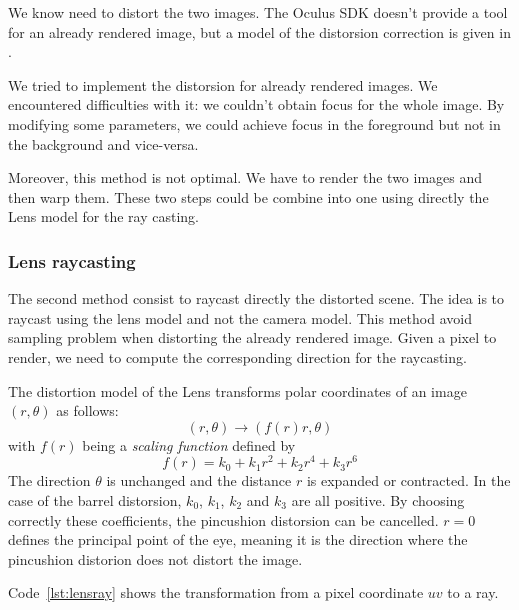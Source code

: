 \documentclass[12pt]{article}
\begin{document}
We know need to distort the two images. The Oculus SDK doesn't provide a tool for an already rendered image, but a model of the distorsion correction is given in \cite{OVRSDK}.

We tried to implement the distorsion for already rendered images. We encountered difficulties with it: we couldn't obtain focus for the whole image. By modifying some parameters, we could achieve focus in the foreground but not in the background and vice-versa.

Moreover, this method is not optimal. We have to render the two images and then warp them. These two steps could be combine into one using directly the Lens model for the ray casting.

\subsubsection{Lens raycasting}
The second method consist to raycast directly the distorted scene. The idea is to raycast using the lens model and not the camera model. This method avoid sampling problem when distorting the already rendered image. Given a pixel to render, we need to compute the corresponding direction for the raycasting.

The distortion model of the Lens transforms polar coordinates of an image $(r,\theta)$ as follows:
$$(r,\theta)\rightarrow (f(r)r, \theta)$$
with $f(r)$ being a \textit{scaling function} defined by
$$f(r)=k_0+k_1r^2+k_2r^4+k_3r^6$$
The direction $\theta$ is unchanged and the distance $r$ is expanded or contracted. In the case of the barrel distorsion, $k_0$, $k_1$, $k_2$ and $k_3$ are all positive. By choosing correctly these coefficients, the pincushion distorsion can be cancelled. $r = 0$ defines the principal point of the eye, meaning it is the direction where the pincushion distorion does not distort the image.

Code~\ref{lst:lensray} shows the transformation from a pixel coordinate $uv$ to a ray.
\end{document}
